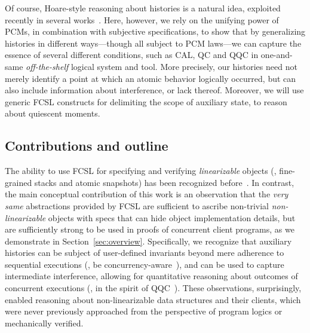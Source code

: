 Of course, Hoare-style reasoning about histories is a natural idea,
exploited recently in several
works~\cite{Fu-al:CONCUR10,Gotsman-al:ESOP13,Bell-al:SAS10,Hemed-al:DISC15}. Here,
however, we rely on the unifying power of PCMs, in combination with
subjective specifications, to show that by generalizing histories in
different ways---though all subject to PCM laws---we can capture the
essence of several different conditions, such as CAL, QC and QQC in
one-and-same \emph{off-the-shelf} logical system and tool.
%
More precisely, our histories need not merely identify a point at
which an atomic behavior logically occurred, but can also include
information about interference, or lack thereof. Moreover, we will use
generic FCSL constructs for delimiting the scope of auxiliary state,
to reason about quiescent moments.
%
%

\subsection{Contributions and outline}
\label{sec:chall-contr}

The ability to use FCSL for specifying and verifying
\emph{linearizable} objects (\eg, fine-grained stacks and atomic
snapshots) has been recognized before~\cite{Sergey-al:ESOP15}.
%
In contrast, the main conceptual contribution of this work is an
observation that the \emph{very same} abstractions provided by FCSL
are sufficient to ascribe non-trivial \emph{non-linearizable} objects
with specs that can hide object implementation details, but are
sufficiently strong to be used in proofs of concurrent client
programs, as we demonstrate in Section~\ref{sec:overview}.
%
Specifically, we recognize that auxiliary histories can be subject of
user-defined invariants beyond mere adherence to sequential executions
(\eg, be concurrency-aware~\cite{Hemed-Rinetzky:PODC14}), and can be
used to capture intermediate interference, allowing for quantitative
reasoning about outcomes of concurrent executions (\eg, in the spirit
of QQC~\cite{Jagadeesan-Riely:ICALP14}). These observations,
surprisingly, enabled reasoning about non-linearizable data structures
and their clients, which were never previously approached from the
perspective of program logics or mechanically verified.

